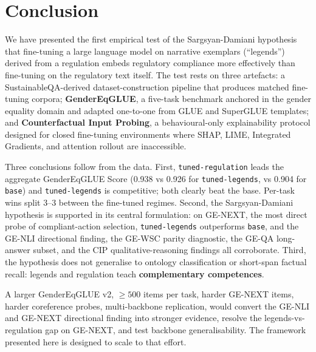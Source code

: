 \documentclass[pdflatex, sn-apa]{sn-jnl}%
\theoremstyle{thmstyleone}%
\theoremstyle{thmstyletwo}%
\theoremstyle{thmstylethree}%
\newcommand{\modelbase}{\texttt{base}}
\newcommand{\modellegends}{\texttt{tuned-legends}}
\newcommand{\modelreg}{\texttt{tuned-regulation}}
\begin{document}
\section{Conclusion}
\label{sec:conclusion}

We have presented the first empirical test of the Sargsyan-Damiani hypothesis
that fine-tuning a large language model on narrative exemplars (``legends'')
derived from a regulation embeds regulatory compliance more effectively than
fine-tuning on the regulatory text itself. The test rests on three artefacts: a
SustainableQA-derived dataset-construction pipeline that produces matched
fine-tuning corpora; \textbf{GenderEqGLUE}, a five-task benchmark anchored in
the gender equality domain and adapted one-to-one from GLUE and SuperGLUE
templates; and \textbf{Counterfactual Input Probing}, a behavioural-only
explainability protocol designed for closed fine-tuning environments where SHAP,
LIME, Integrated Gradients, and attention rollout are inaccessible.

Three conclusions follow from the data. First, \modelreg{} leads the aggregate
GenderEqGLUE Score (0.938 vs 0.926 for \modellegends, vs 0.904 for \modelbase)
and \modellegends{} is competitive; both clearly beat the base. Per-task wins
split 3--3 between the fine-tuned regimes. Second, the Sargsyan-Damiani
hypothesis is supported in its central formulation: on GE-NEXT, the most direct
probe of compliant-action selection, \modellegends{} outperforms \modelbase{},
and the GE-NLI directional finding, the GE-WSC parity diagnostic, the GE-QA
long-answer subset, and the CIP qualitative-reasoning findings all corroborate.
Third, the hypothesis does not generalise to ontology classification or
short-span factual recall: legends and regulation teach \textbf{complementary
competences}.

A larger GenderEqGLUE v2, $\geq 500$ items per task, harder GE-NEXT items,
harder coreference probes, multi-backbone replication, would convert the GE-NLI
and GE-NEXT directional finding into stronger evidence, resolve the
legends-vs-regulation gap on GE-NEXT, and test backbone generalisability. The
framework presented here is designed to scale to that effort.




\appendix
{}
\end{document}
